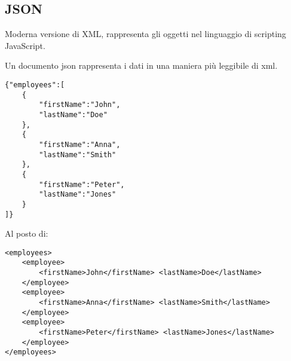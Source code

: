 \subsection{JSON}
Moderna versione di XML, rappresenta gli oggetti nel linguaggio di scripting JavaScript.

Un documento json rappresenta i dati in una maniera più leggibile di xml.
\begin{lstlisting}
{"employees":[
    {
        "firstName":"John",
        "lastName":"Doe"
    },
    {
        "firstName":"Anna",
        "lastName":"Smith"
    },
    {
        "firstName":"Peter",
        "lastName":"Jones"
    }
]}
\end{lstlisting}
Al posto di:
\begin{lstlisting}
<employees>
    <employee>
        <firstName>John</firstName> <lastName>Doe</lastName>
    </employee>
    <employee>
        <firstName>Anna</firstName> <lastName>Smith</lastName>
    </employee>
    <employee>
        <firstName>Peter</firstName> <lastName>Jones</lastName>
    </employee>
</employees>
\end{lstlisting}